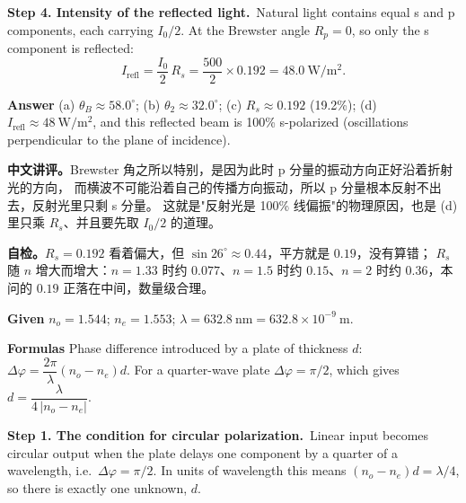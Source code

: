 ﻿\documentclass[11pt]{ctexart}
\begin{document}
\textbf{Step 4. Intensity of the reflected light.}\ Natural light contains equal s and p components, each carrying $I_0/2$. At the Brewster angle
$R_p=0$, so only the s component is reflected:
\[
I_{\text{refl}}=\frac{I_0}{2}\,R_s=\frac{500}{2}\times 0.192=48.0\ \mathrm{W/m^2}.
\]

\textbf{Answer}\quad
(a) $\theta_B\approx 58.0^\circ$;\quad
(b) $\theta_2\approx 32.0^\circ$;\quad
(c) $R_s\approx 0.192$ (19.2\%);\quad
(d) $I_{\text{refl}}\approx 48\ \mathrm{W/m^2}$, and this reflected beam is 100\% s-polarized
(oscillations perpendicular to the plane of incidence).

\textbf{中文讲评。}Brewster 角之所以特别，是因为此时 p 分量的振动方向正好沿着折射光的方向，
而横波不可能沿着自己的传播方向振动，所以 p 分量根本反射不出去，反射光里只剩 s 分量。
这就是"反射光是 100\% 线偏振"的物理原因，也是 (d) 里只乘 $R_s$、并且要先取 $I_0/2$ 的道理。

\textbf{自检。}$R_s=0.192$ 看着偏大，但 $\sin 26^\circ\approx 0.44$，平方就是 $0.19$，没有算错；
$R_s$ 随 $n$ 增大而增大：$n=1.33$ 时约 $0.077$、$n=1.5$ 时约 $0.15$、$n=2$ 时约 $0.36$，本问的 $0.19$ 正落在中间，数量级合理。

\qbreak
{}


\textbf{Given}\quad
$n_o=1.544$;\; $n_e=1.553$;\; $\lambda=632.8\ \mathrm{nm}=632.8\times10^{-9}\ \mathrm{m}$.

\textbf{Formulas}\quad
Phase difference introduced by a plate of thickness $d$:
$\Delta\varphi=\dfrac{2\pi}{\lambda}(n_o-n_e)d$.\;
For a quarter-wave plate $\Delta\varphi=\pi/2$, which gives
$d=\dfrac{\lambda}{4\,|n_o-n_e|}$.

\textbf{Step 1. The condition for circular polarization.}\ Linear input becomes circular output when the plate delays one component by a quarter of a
wavelength, i.e.\ $\Delta\varphi=\pi/2$. In units of wavelength this means
$(n_o-n_e)d=\lambda/4$, so there is exactly one unknown, $d$.
\end{document}
